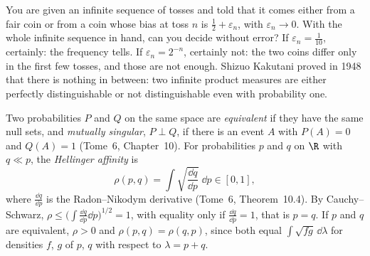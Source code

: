 You are given an infinite sequence of tosses and told that it comes either from a fair coin or from a coin whose bias at toss $n$ is $\frac12+\varepsilon_n$, with $\varepsilon_n\to0$. With the whole infinite sequence in
hand, can you decide without error? If $\varepsilon_n=\frac1{10}$, certainly: the frequency tells. If $\varepsilon_n=2^{-n}$, certainly not: the two coins differ only in the first few tosses, and those are not enough. Shizuo Kakutani
proved in 1948 that there is nothing in between: two infinite product measures are either perfectly distinguishable or not distinguishable even with probability one.

Two probabilities $P$ and $Q$ on the same space are \emph{equivalent} if they have the same null sets, and \emph{mutually singular}, $P\perp Q$, if there is an event $A$ with $P(A)=0$ and $Q(A)=1$ (Tome~6,
Chapter~10). For probabilities $p$ and $q$ on $\R$ with $q\ll p$, the \emph{Hellinger affinity} is
\[
\rho(p,q)=\int\sqrt{\frac{\dd q}{\dd p}}\;\dd p\in[0,1],
\]
where $\frac{\dd q}{\dd p}$ is the Radon--Nikodym derivative (Tome~6, Theorem~10.4). By Cauchy--Schwarz, $\rho\le\bigl(\int\frac{\dd q}{\dd p}\dd p\bigr)^{1/2}=1$, with equality only if $\frac{\dd q}{\dd p}=1$, that is $p=q$. If $p$ and $q$ are equivalent, $\rho>0$
and $\rho(p,q)=\rho(q,p)$, since both equal $\int\sqrt{fg}\,\dd\lambda$ for densities $f$, $g$ of $p$, $q$ with respect to $\lambda=p+q$.

